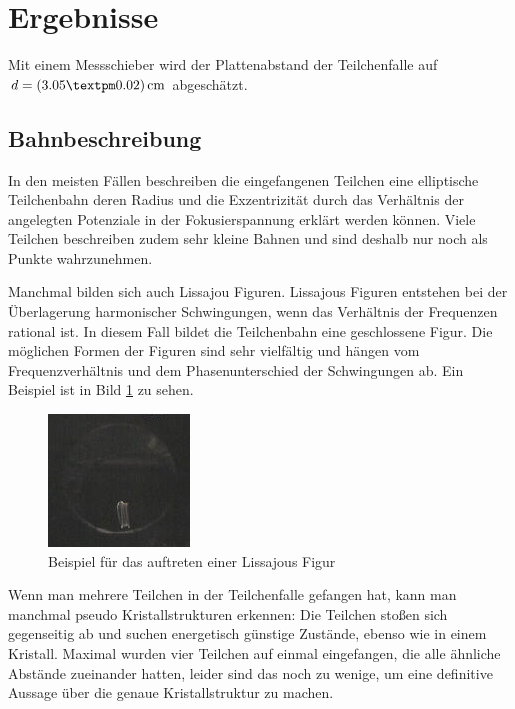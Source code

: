 \documentclass[a4paper,12pt]{article}
\begin{document}
\section{Ergebnisse}
Mit einem Messschieber wird der Plattenabstand der Teilchenfalle auf $d = \unit[(3.05±0.02)]{cm}$ abgeschätzt.
\subsection{Bahnbeschreibung}
In den meisten Fällen beschreiben die eingefangenen Teilchen eine elliptische Teilchenbahn deren Radius und die Exzentrizität durch das Verhältnis der angelegten Potenziale in der Fokusierspannung erklärt werden können.
Viele Teilchen beschreiben zudem sehr kleine Bahnen und sind deshalb nur noch als Punkte wahrzunehmen.

Manchmal bilden sich auch Lissajou Figuren. Lissajous Figuren entstehen bei der Überlagerung harmonischer Schwingungen, wenn das Verhältnis der Frequenzen rational ist.
In diesem Fall bildet die Teilchenbahn eine geschlossene Figur.
Die möglichen Formen der Figuren sind sehr vielfältig und hängen vom Frequenzverhältnis und dem Phasenunterschied der Schwingungen ab.
Ein Beispiel ist in Bild \ref{Lissjous} zu sehen.

\begin{figure}[htb]
		\centering
		\includegraphics{lisa_klein.jpg}
		\caption{Beispiel für das auftreten einer Lissajous Figur}
		\label{Lissjous}
\end{figure}

Wenn man mehrere Teilchen in der Teilchenfalle gefangen hat, kann man manchmal pseudo Kristallstrukturen erkennen:
Die Teilchen stoßen sich gegenseitig ab und suchen energetisch günstige Zustände, ebenso wie in einem Kristall.
Maximal wurden vier Teilchen auf einmal eingefangen, die alle ähnliche Abstände zueinander hatten, leider sind das noch zu wenige, um eine definitive Aussage über die genaue Kristallstruktur zu machen.
\end{document}
